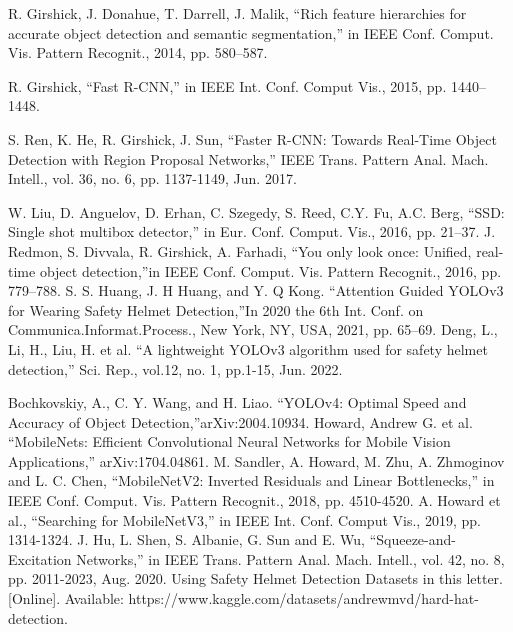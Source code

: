 \documentclass[journal]{IEEEtran}
\begin{document}
\begin{thebibliography}{1}
\bibitem{}R. Girshick, J. Donahue, T. Darrell, J. Malik, “Rich feature hierarchies for accurate object detection and semantic segmentation,” in IEEE Conf. Comput. Vis. Pattern Recognit., 2014, pp. 580–587.

\bibitem{}R. Girshick, “Fast R-CNN,” in IEEE Int. Conf. Comput Vis., 2015, pp. 1440–1448.

\bibitem{}S. Ren, K. He, R. Girshick, J. Sun, “Faster R-CNN: Towards Real-Time Object Detection with Region Proposal Networks,” IEEE Trans. Pattern Anal. Mach. Intell., vol. 36, no. 6, pp. 1137-1149, Jun. 2017.


\bibitem{}W. Liu, D. Anguelov, D. Erhan, C. Szegedy, S. Reed, C.Y. Fu, A.C.
Berg, “SSD: Single shot multibox detector,” in Eur. Conf. Comput. Vis., 2016, pp. 21–37.
\bibitem{} J. Redmon, S. Divvala, R. Girshick, A. Farhadi, “You only look once: Unified, real-time object detection,”in IEEE Conf. Comput. Vis. Pattern Recognit., 2016, pp. 779–788.
\bibitem{} S. S. Huang, J. H Huang, and Y. Q Kong. “Attention Guided YOLOv3 for Wearing Safety Helmet Detection,”In 2020 the 6th Int. Conf. on Communica.Informat.Process., New York, NY, USA, 2021, pp. 65–69.
\bibitem{} Deng, L., Li, H., Liu, H. et al. “A lightweight YOLOv3 algorithm used for safety helmet detection,” Sci. Rep., vol.12, no. 1, pp.1-15, Jun. 2022.

\bibitem{} Bochkovskiy, A.,  C. Y. Wang, and  H. Liao. “YOLOv4: Optimal Speed and Accuracy of Object Detection,”arXiv:2004.10934.
\bibitem{}Howard, Andrew G. et al. “MobileNets: Efficient Convolutional Neural Networks for Mobile Vision Applications,” arXiv:1704.04861.
\bibitem{}M. Sandler, A. Howard, M. Zhu, A. Zhmoginov and L. C. Chen, “MobileNetV2: Inverted Residuals and Linear Bottlenecks,” in IEEE Conf. Comput. Vis. Pattern Recognit., 2018, pp. 4510-4520.
\bibitem{}A. Howard et al., “Searching for MobileNetV3,” in IEEE Int. Conf. Comput Vis., 2019, pp. 1314-1324.
\bibitem{}J. Hu, L. Shen, S. Albanie, G. Sun and E. Wu, “Squeeze-and-Excitation Networks,” in IEEE Trans. Pattern Anal. Mach. Intell., vol. 42, no. 8, pp. 2011-2023, Aug. 2020.
\bibitem{}Using Safety Helmet Detection Datasets in this letter. [Online]. Available: https://www.kaggle.com/datasets/andrewmvd/hard-hat-detection.
\end{thebibliography}
\end{document}
